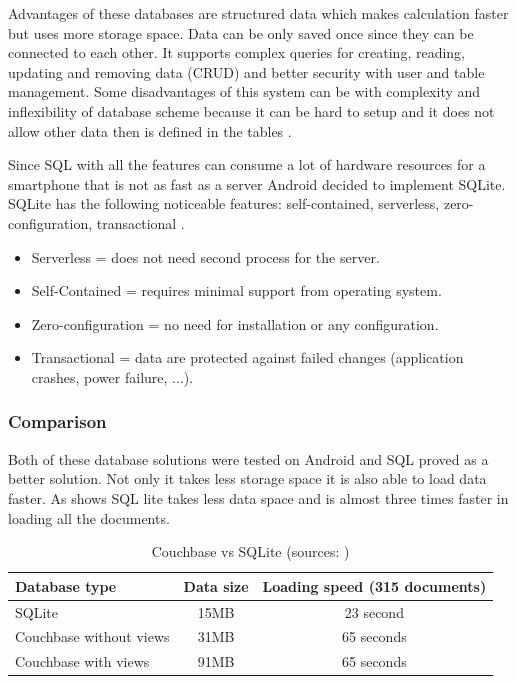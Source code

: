 Advantages of these databases are structured data which makes calculation faster but uses more storage space. Data can be only saved once since they can be connected to each other. It supports complex queries for creating, reading, updating and removing data (CRUD) and better security with user and table management. Some disadvantages of this system can be with complexity and inflexibility of database scheme because it can be hard to setup and it does not allow other data then is defined in the tables \cite{ERDMS}.

Since SQL with all the features can consume a lot of hardware resources for a smartphone that is not as fast as a server Android decided to implement SQLite. SQLite has the following noticeable features: self-contained, serverless, zero-configuration, transactional \cite{WISQLITE}.

\begin{itemize}
	\item Serverless = does not need second process for the server.
	\item Self-Contained = requires minimal support from operating system.
	\item Zero-configuration = no need for installation or any configuration.
	\item Transactional = data are protected against failed changes (application crashes, power failure, ...).
\end{itemize}

\subsubsection{Comparison}\label{subsec:Comparison}
Both of these database solutions were tested on Android and SQL proved as a better solution. Not only it takes less storage space it is also able to load data faster. As  shows SQL lite takes less data space and is almost three times faster in loading all the documents.

\begin{table}[h]
	\begin{center}
		\begin{tabular}{| l | c | c |}
			\hline
			Database type & Data size & Loading speed (315 documents) \\ \hline
			SQLite & 15MB & 23 second \\ \hline
			Couchbase without views & 31MB & 65 seconds \\ \hline
			Couchbase with views & 91MB & 65 seconds \\ \hline
		\end{tabular}
		\caption{Couchbase vs SQLite (sources: \cite{LGWSP, LGWST, HW2, PM600, AZW3})}
		\label{tab3}
	\end{center}
\end{table}


